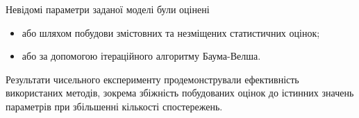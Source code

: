 \documentclass[12pt,mathserif]{beamer}
\theoremstyle{plain}
\begin{document}
\begin{frame}
    \frametitle{\insertsection} 
    
    Невідомі параметри заданої моделі були оцінені 
    \begin{itemize}
        \item або шляхом побудови змістовних та незміщених статистичних оцінок;
        \item або за допомогою ітераційного алгоритму Баума-Велша.
    \end{itemize}
    \vspace{0.5cm}

    Результати чисельного експерименту продемонстрували ефективність використаних методів, зокрема збіжність побудованих оцінок до істинних значень параметрів при збільшенні кількості спостережень.
\end{frame}
\end{document}

